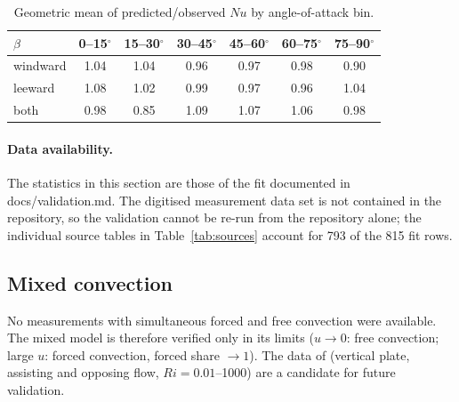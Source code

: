 \documentclass[11pt,a4paper]{article}
\newcommand{\Nu}{\mathit{Nu}}
\newcommand{\codeus}{\char95\allowbreak}
\DeclareRobustCommand{\code}[1]{\textnormal{\ttfamily\let\_\codeus #1}}
\begin{document}
\begin{table}[ht]
\centering\small
\caption{Geometric mean of predicted/observed $\Nu$ by angle-of-attack bin.}\label{tab:bins}
\begin{tabular}{l c c c c c c}
\toprule
$\beta$ & 0--15$^\circ$ & 15--30$^\circ$ & 30--45$^\circ$ & 45--60$^\circ$ & 60--75$^\circ$ & 75--90$^\circ$\\
\midrule
windward & 1.04 & 1.04 & 0.96 & 0.97 & 0.98 & 0.90\\
leeward  & 1.08 & 1.02 & 0.99 & 0.97 & 0.96 & 1.04\\
both     & 0.98 & 0.85 & 1.09 & 1.07 & 1.06 & 0.98\\
\bottomrule
\end{tabular}
\end{table}

\paragraph{Data availability.} The statistics in this section are those of the fit documented in \code{docs/validation.md}. The digitised measurement data set is not contained in the repository, so the validation cannot be re-run from the repository alone; the individual source tables in Table~\ref{tab:sources} account for 793 of the 815 fit rows.

\subsection{Mixed convection}
No measurements with simultaneous forced and free convection were available. The mixed model is therefore verified only in its limits ($u\to0$: free convection; large $u$: forced convection, forced share $\to1$). The data of \citet{kobus1996} (vertical plate, assisting and opposing flow, $Ri = 0.01$--1000) are a candidate for future validation.

\end{document}
